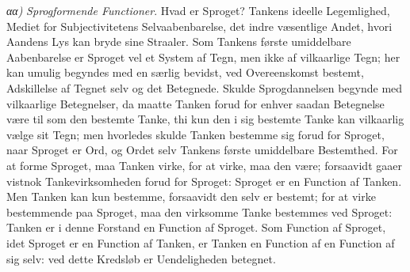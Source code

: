 \documentclass[12pt]{book}
\newcommand{\opage}[1]{\marginnote{\footnotesize\textit{[#1]}}}
\begin{document}
\textit{αα)} \emph{Sprogformende Functioner}. Hvad er Sproget?
Tankens ideelle Legemlighed, Mediet for Subjectivitetens Selvaabenbarelse,
det indre væsentlige Andet, hvori Aandens Lys
kan bryde sine Straaler. Som Tankens første umiddelbare
Aabenbarelse er Sproget vel et System af Tegn, men ikke af
vilkaarlige Tegn; her kan umulig begyndes med en særlig bevidst,
ved Overeenskomst bestemt, Adskillelse af Tegnet selv
og det Betegnede. Skulde Sprogdannelsen begynde med
vilkaarlige Betegnelser, da maatte Tanken forud for enhver
saadan Betegnelse være til som den bestemte Tanke, thi
kun den i sig bestemte Tanke kan vilkaarlig vælge sit Tegn;
men hvorledes skulde Tanken bestemme sig forud for Sproget,
naar Sproget er Ord, og Ordet selv Tankens første umiddelbare
Bestemthed. For at forme Sproget, maa Tanken virke,
for at virke, maa den være; forsaavidt gaaer vistnok Tankevirksomheden
forud for Sproget: Sproget er en Function af
Tanken. Men Tanken kan kun bestemme, forsaavidt den selv
\opage{21}er bestemt; for at virke bestemmende paa Sproget, maa den
virksomme Tanke bestemmes ved Sproget: Tanken er i denne
Forstand en Function af Sproget. Som Function af Sproget,
idet Sproget er en Function af Tanken, er Tanken en Function
af en Function af sig selv: ved dette Kredsløb er Uendeligheden
betegnet.
\end{document}
